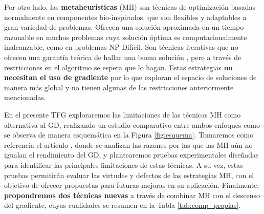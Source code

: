 Por otro lado, las \textbf{metaheurísticas} (MH) \cite{mhhandbook} son técnicas de optimización basadas normalmente en componentes bio-inspirados, que son flexibles y adaptables a gran variedad de problemas. Ofrecen una solución aproximada en un tiempo razonable en muchos problemas cuya solución óptima es computacionalmente inalcanzable, como en problemas NP-Difícil. Son técnicas iterativas que no ofrecen una garantía teórica de hallar una buena solución \cite{MH_desing_imp}, pero a través de restricciones en el algoritmo se espera que lo hagan. Estas estrategias \textbf{no necesitan el uso de gradiente} por lo que exploran el espacio de soluciones de manera más global y no tienen algunas de las restricciones anteriormente mencionadas.





En el presente TFG exploraremos las limitaciones de las técnicas MH como alternativa al GD, realizando un estudio comparativo entre ambos enfoques como se observa de manera esquemática en la Figura \ref{fig:esquema}. Tomaremos como referencia el artículo \cite{MHtrainingClase}, donde se analizan las razones por las que las MH aún no igualan el rendimiento del GD, y plantearemos pruebas experimentales diseñadas para identificar las principales limitaciones de estas técnicas. A su vez, estas pruebas permitirán evaluar las virtudes y defectos de las estrategias MH, con el objetivo de ofrecer propuestas para futuras mejoras en su aplicación. Finalmente, \textbf{propondremos dos técnicas nuevas} a través de combinar MH con el descenso del gradiente, cuyas cualidades se resumen en la Tabla \ref{tab:comp_propias}.







